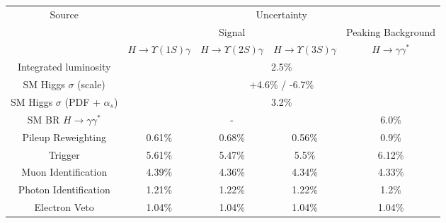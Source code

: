 

\begin{tabular}{c|c|c|c|c}
\cline{1-5}
\multirow{3}{*}{Source} & \multicolumn{4}{c}{Uncertainty} \\
\cline{2-5}
& \multicolumn{3}{c|}{Signal} & Peaking Background   \\
\cline{2-5}
& $H \rightarrow \Upsilon(1S)  \gamma$ & $H \rightarrow \Upsilon(2S)  \gamma$ & $H \rightarrow \Upsilon(3S)  \gamma$ & $H \rightarrow \gamma\gamma^{*}$  \\
\hline\hline
Integrated luminosity & \multicolumn{4}{c}{2.5\%} \\
\hline
SM Higgs $\sigma$ (scale) & \multicolumn{4}{c}{+4.6\% / -6.7\%}  \\
\hline
SM Higgs $\sigma$ (PDF + $\alpha_s$) & \multicolumn{4}{c}{3.2\%}  \\
\hline
SM BR $H \rightarrow \gamma\gamma^{*}$  & \multicolumn{3}{c|}{-}  & \multicolumn{1}{c}{6.0\%} \\
\hline
Pileup Reweighting & 0.61\% & 0.68\% & 0.56\% & 0.9\% \\
\hline
Trigger & 5.61\% & 5.47\% & 5.5\% & 6.12\% \\
\hline
Muon Identification & 4.39\% & 4.36\% & 4.34\% & 4.33\% \\
\hline
Photon Identification  & 1.21\% & 1.22\% & 1.22\% & 1.2\% \\
\hline
Electron Veto & 1.04\% & 1.04\% & 1.04\% & 1.04\% \\
\hline
\end{tabular}
